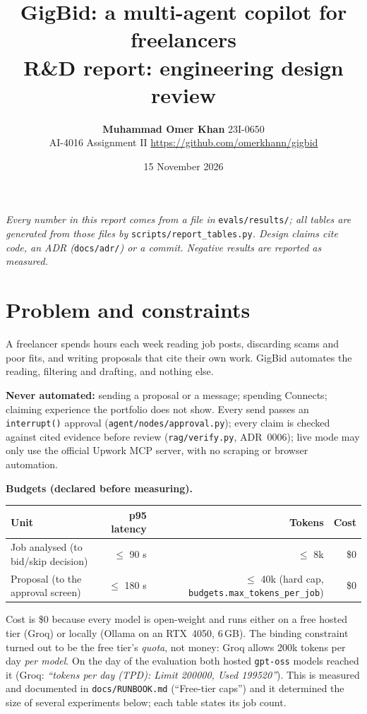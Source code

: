 \documentclass[10pt,a4paper]{article}
\title{\vspace{-8mm}\textbf{GigBid: a multi-agent copilot for freelancers}\\[2pt]\large R\&D report: engineering design review}
\author{\textbf{Muhammad Omer Khan} \quad\textperiodcentered\quad 23I-0650\\[2pt]
AI-4016 Assignment II \quad\textperiodcentered\quad \url{https://github.com/omerkhann/gigbid}}
\date{15 November 2026}
\newcommand{\res}[1]{\texttt{\small evals/results/#1}}
\newcommand{\code}[1]{\texttt{\small #1}}
\begin{document}
\maketitle
\vspace{-6mm}
\noindent\emph{Every number in this report comes from a file in} \res{}\emph{; all tables are generated from those files by} \code{scripts/report\_tables.py}\emph{. Design claims cite code, an ADR (}\code{docs/adr/}\emph{) or a commit. Negative results are reported as measured.}

\section{Problem and constraints}

A freelancer spends hours each week reading job posts, discarding scams and poor fits, and writing proposals that cite their own work. GigBid automates the reading, filtering and drafting, and nothing else.

\textbf{Never automated:} sending a proposal or a message; spending Connects; claiming experience the portfolio does not show. Every send passes an \code{interrupt()} approval (\code{agent/nodes/approval.py}); every claim is checked against cited evidence before review (\code{rag/verify.py}, ADR~0006); live mode may only use the official Upwork MCP server, with no scraping or browser automation.

\textbf{Budgets (declared before measuring).}
\begin{center}\small
\begin{tabular}{lrrr}\toprule
Unit & p95 latency & Tokens & Cost \\\midrule
Job analysed (to bid/skip decision) & $\le$ 90 s & $\le$ 8k & \$0 \\
Proposal (to the approval screen) & $\le$ 180 s & $\le$ 40k (hard cap, \code{budgets.max\_tokens\_per\_job}) & \$0 \\\bottomrule
\end{tabular}\end{center}
Cost is \$0 because every model is open-weight and runs either on a free hosted tier (Groq) or locally (Ollama on an RTX~4050, 6\,GB). The binding constraint turned out to be the free tier's \emph{quota}, not money: Groq allows 200k tokens per day \emph{per model}. On the day of the evaluation both hosted \code{gpt-oss} models reached it (Groq: \emph{``tokens per day (TPD): Limit 200000, Used 199520''}). This is measured and documented in \code{docs/RUNBOOK.md} (``Free-tier caps'') and it determined the size of several experiments below; each table states its job count.
\end{document}
